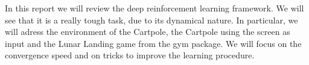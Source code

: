 In this report we will review the deep reinforcement learning framework. We will see that it is a really tough task, due to its dynamical
nature. In particular, we will adress the environment of the Cartpole, the Cartpole using the screen as input and the Lunar Landing game
from the gym package. We will focus on the convergence speed and on tricks to improve the learning procedure.